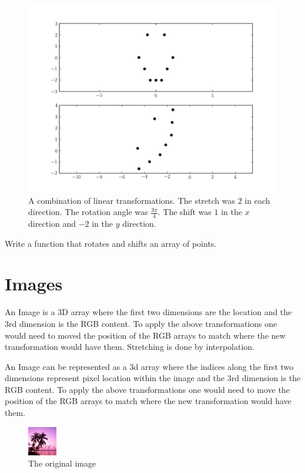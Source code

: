 \begin{figure}
\centering
\includegraphics[width=\textwidth]{combo.pdf}
\caption{
A combination of linear transformations.
The stretch was $2$ in each direction.
The rotation angle was $\frac{3\pi}{4}$.
The shift was $1$ in the $x$ direction and $-2$ in the $y$ direction.}
\label{basis:combo}
\end{figure}

\begin{problem}
Write a function that rotates and shifts an array of points.
\end{problem}

\section*{Images}
An Image is a 3D array where the first two dimensions are the location and the 3rd dimension is the RGB content. To apply the above transformations one would need to moved the position of the RGB arrays to match where the new transformation would have them. Stretching is done by interpolation.

An Image can be represented as a 3d array where the indices along the first two dimensions represent pixel location within the image and the 3rd dimension is the RGB content.
To apply the above transformations one would need to move the position of the RGB arrays to match where the new transformation would have them.

\begin{figure}
\centering
\includegraphics[scale=2.0]{dream.png}
\caption{The original image}
\label{basis:image}
\end{figure}

